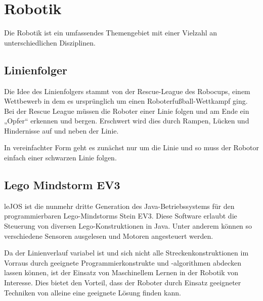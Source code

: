 \chapter{Robotik} %
\label{cha:robotik}

Die Robotik ist ein umfassendes Themengebiet mit einer Vielzahl an unterschiedlichen Disziplinen.

\section{Linienfolger} %
\label{sec:linienfolger}

Die Idee des Linienfolgers stammt von der Rescue-League des Robocups, einem Wettbewerb in dem es ursprünglich um einen Roboterfußball-Wettkampf ging. Bei der Rescue League müssen die Roboter einer Linie folgen und am Ende ein „Opfer“ erkennen und bergen. Erschwert wird dies durch Rampen, Lücken und Hindernisse auf und neben der Linie.

In vereinfachter Form geht es zunächst nur um die Linie und so muss der Robotor einfach einer schwarzen Linie folgen.


\section{Lego Mindstorm EV3} %
\label{sec:lego_mindstorm_ev3}

leJOS ist die nunmehr dritte Generation des Java-Betriebssystems für den programmierbaren Lego-Mindstorms Stein EV3. Diese Software erlaubt die Steuerung von diversen Lego-Konstruktionen in Java. Unter anderem können so verschiedene Sensoren ausgelesen und Motoren angesteuert werden.\par
Da der Linienverlauf variabel ist und sich nicht alle Streckenkonstruktionen im Vorraus durch geeignete Programmierkonstrukte und -algorithmen abdecken lassen können, ist der Einsatz von Maschinellem Lernen in der Robotik von Interesse. Dies bietet den Vorteil, dass der Roboter durch Einsatz geeigneter Techniken von alleine eine geeignete Lösung finden kann.


